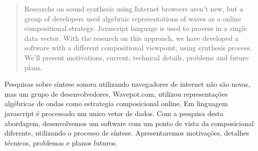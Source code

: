 \documentclass[12pt]{article}
\begin{document}
 

\maketitle


\begin{abstract}
Researchs on sound synthesis using Internet browsers aren't new,  but a group of developers used algebraic representations of waves as a online compositional strategy. Javascript language is used to process in a single data vector. With the research on this approach, we have developed a software with a different  compositional viewpoint, using synthesis process. We'll present motivations, current, technical details, problems and future plans.
\end{abstract}

\begin{resumo} 
Pesquisas sobre síntese sonora utilizando navegadores de internet não são novas, mas um grupo de desenvolvedores, Wavepot.com, utilizou representações algébricas de ondas como estrategia composicional online. Em linguagem javascript é processado um unico vetor de dados. Com a pesquisa desta abordagem, desenvolvemos um software com um ponto de vista da composicional diferente, utilizando o processo de síntese. Apresentaremos motivações, detalhes técnicos, problemas e planos futuros.
\end{resumo}



%

%
%
 


\end{document}
